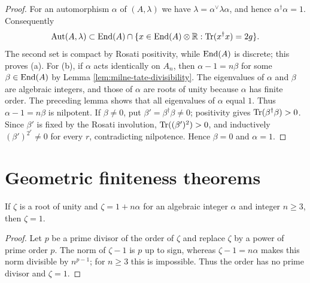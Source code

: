 \begin{proof}
For an automorphism $\alpha$ of $(A,\lambda)$ we have
$\lambda=\alpha^\vee\lambda\alpha$, and hence $\alpha^\dagger\alpha=1$.
Consequently
\[
\operatorname{Aut}(A,\lambda)\subset
\operatorname{End}(A)\cap\{x\in\operatorname{End}(A)\otimes\mathbb{R}:\operatorname{Tr}(x^\dagger x)=2g\}.
\]
The second set is compact by Rosati positivity, while $\operatorname{End}(A)$ is discrete;
this proves (a).  For (b), if $\alpha$ acts identically on $A_n$, then
$\alpha-1=n\beta$ for some $\beta\in\operatorname{End}(A)$ by Lemma
\ref{lem:milne-tate-divisibility}.  The eigenvalues of $\alpha$ and $\beta$
are algebraic integers, and those of $\alpha$ are roots of unity because
$\alpha$ has finite order.  The preceding lemma shows that all eigenvalues of
$\alpha$ equal $1$.  Thus $\alpha-1=n\beta$ is nilpotent.  If $\beta\ne0$,
put $\beta' =\beta^\dagger\beta\ne0$; positivity gives
$\operatorname{Tr}(\beta^\dagger\beta)>0$.  Since $\beta'$ is fixed by the Rosati
involution, $\operatorname{Tr}((\beta')^2)>0$, and inductively $(\beta')^{2^r}\ne0$ for
every $r$, contradicting nilpotence.  Hence $\beta=0$ and $\alpha=1$.
\end{proof}


\section{Geometric finiteness theorems}
\begin{lemma}\label{lem:milne-root-unity}
If $\zeta$ is a root of unity and $\zeta=1+n\alpha$ for an algebraic integer $\alpha$ and integer $n\ge3$, then $\zeta=1$.
\end{lemma}

\begin{proof}

Let $p$ be a prime divisor of the order of $\zeta$ and replace $\zeta$ by a
power of prime order $p$.  The norm of $\zeta-1$ is $p$ up to sign, whereas
$\zeta-1=n\alpha$ makes this norm divisible by $n^{p-1}$; for $n\ge3$ this
is impossible.  Thus the order has no prime divisor and $\zeta=1$.

\end{proof}


